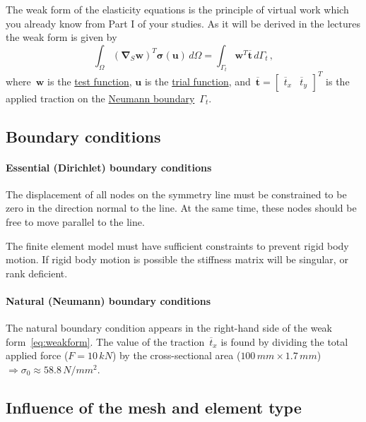\documentclass[11pt,a4paper]{article}
\newcommand{\fett}[1]{\boldsymbol{#1}}
\renewcommand{\vec}[1]{\fett{#1}}
\begin{document}
The weak form of the elasticity equations is the principle of virtual work which you already know from Part I of your studies. As it will be derived in the lectures the weak form is given by 
%
\begin{equation} \label{eq:weakform}
\int_\Omega (\vec \nabla_S \vec w)^T \fett \sigma (\vec u) \, d\Omega = \int_{\Gamma_t} \vec w^T \overline{\fett t} \, d \Gamma_t  \, , 
\end{equation}
%
where~$\vec w$ is the \underline{test function}, $\vec u$ is the \underline{trial function}, and~$\overline{\vec t} = \begin{bmatrix}  \overline t_x & \overline t_y \end{bmatrix}^T$ is the applied traction on the \underline{Neumann boundary}~$\Gamma_t$.



%
\subsection{Boundary conditions}
%
\paragraph{Essential (Dirichlet) boundary conditions} The displacement of all nodes on the symmetry line must be constrained to be zero in the direction normal to the line. At the same time, these nodes should be free to move parallel to the line. 

The finite element model must have sufficient constraints to prevent rigid body motion. If rigid body motion is possible  the stiffness matrix will be singular, or rank deficient.   


\paragraph{Natural (Neumann) boundary conditions}

The natural boundary condition appears in the right-hand side of the weak form~\eqref{eq:weakform}. The value of the traction~$\overline{t}_x$ is found by dividing the total applied force ($F = 10 \, kN$) by the cross-sectional area ($100 \, mm \times 1.7 \, mm$) \mbox{$\Rightarrow \sigma_0 \approx  58.8\,  N/mm^2$}. 
%
\subsection{Influence of the mesh and element type}
%
\end{document}
